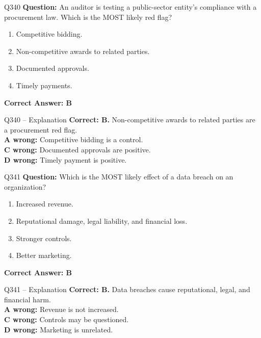 \documentclass[aspectratio=169,10pt]{beamer}
\begin{document}
	\begin{frame}[t]{Q340}
		\small
		\textbf{Question:} An auditor is testing a public-sector entity's compliance with a procurement law. Which is the MOST likely red flag?
		\begin{enumerate}[label=\Alph*.,itemsep=1pt,topsep=2pt]
			\item Competitive bidding.
			\item Non-competitive awards to related parties.
			\item Documented approvals.
			\item Timely payments.
		\end{enumerate}
		\vspace{4pt}
		\textbf{Correct Answer: B}
	\end{frame}
	
	\begin{frame}[t]{Q340 -- Explanation}
		\small
		\textbf{Correct: B.} Non-competitive awards to related parties are a procurement red flag. \\[4pt]
		\textbf{A wrong:} Competitive bidding is a control. \\[2pt]
		\textbf{C wrong:} Documented approvals are positive. \\[2pt]
		\textbf{D wrong:} Timely payment is positive.
	\end{frame}
	
	\begin{frame}[t]{Q341}
		\small
		\textbf{Question:} Which is the MOST likely effect of a data breach on an organization?
		\begin{enumerate}[label=\Alph*.,itemsep=1pt,topsep=2pt]
			\item Increased revenue.
			\item Reputational damage, legal liability, and financial loss.
			\item Stronger controls.
			\item Better marketing.
		\end{enumerate}
		\vspace{4pt}
		\textbf{Correct Answer: B}
	\end{frame}
	
	\begin{frame}[t]{Q341 -- Explanation}
		\small
		\textbf{Correct: B.} Data breaches cause reputational, legal, and financial harm. \\[4pt]
		\textbf{A wrong:} Revenue is not increased. \\[2pt]
		\textbf{C wrong:} Controls may be questioned. \\[2pt]
		\textbf{D wrong:} Marketing is unrelated.
	\end{frame}
	
\end{document}

